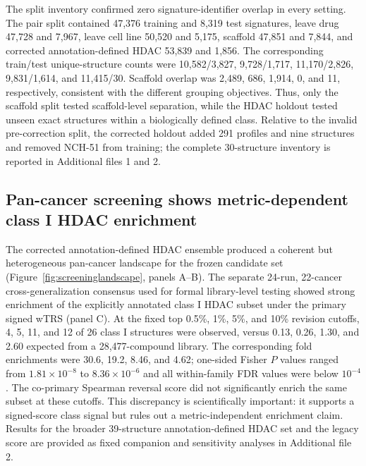 The split inventory confirmed zero signature-identifier overlap in every setting. The pair split contained 47,376 training and 8,319 test signatures, leave drug 47,728 and 7,967, leave cell line 50,520 and 5,175, scaffold 47,851 and 7,844, and corrected annotation-defined HDAC 53,839 and 1,856. The corresponding train/test unique-structure counts were 10,582/3,827, 9,728/1,717, 11,170/2,826, 9,831/1,614, and 11,415/30. Scaffold overlap was 2,489, 686, 1,914, 0, and 11, respectively, consistent with the different grouping objectives. Thus, only the scaffold split tested scaffold-level separation, while the HDAC holdout tested unseen exact structures within a biologically defined class. Relative to the invalid pre-correction split, the corrected holdout added 291 profiles and nine structures and removed NCH-51 from training; the complete 30-structure inventory is reported in Additional files 1 and 2.

\subsection{Pan-cancer screening shows metric-dependent class I HDAC enrichment}

The corrected annotation-defined HDAC ensemble produced a coherent but heterogeneous pan-cancer landscape for the frozen candidate set (Figure~\ref{fig:screeninglandscape}, panels A--B). The separate 24-run, 22-cancer cross-generalization consensus used for formal library-level testing showed strong enrichment of the explicitly annotated class I HDAC subset under the primary signed wTRS (panel C). At the fixed top 0.5\%, 1\%, 5\%, and 10\% revision cutoffs, 4, 5, 11, and 12 of 26 class I structures were observed, versus 0.13, 0.26, 1.30, and 2.60 expected from a 28,477-compound library. The corresponding fold enrichments were 30.6, 19.2, 8.46, and 4.62; one-sided Fisher $P$ values ranged from $1.81\times10^{-8}$ to $8.36\times10^{-6}$ and all within-family FDR values were below $10^{-4}$. The co-primary Spearman reversal score did not significantly enrich the same subset at these cutoffs. This discrepancy is scientifically important: it supports a signed-score class signal but rules out a metric-independent enrichment claim. Results for the broader 39-structure annotation-defined HDAC set and the legacy score are provided as fixed companion and sensitivity analyses in Additional file 2.


